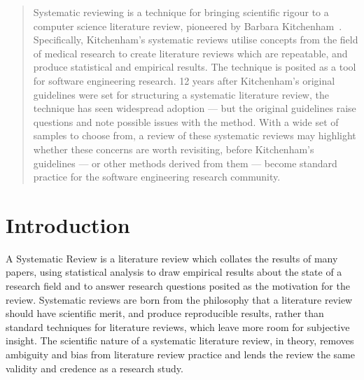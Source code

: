 

\maketitle

\begin{abstract}
Systematic reviewing is a technique for bringing scientific rigour to a computer science literature review, pioneered by Barbara Kitchenham~\citep{Kitchenham2004}. Specifically, Kitchenham's systematic reviews utilise concepts from the field of medical research to create literature reviews which are repeatable, and produce statistical and empirical results. The technique is posited as a tool for software engineering research. 12 years after Kitchenham's original guidelines were set for structuring a systematic literature review, the technique has seen widespread adoption --- but the original guidelines raise questions and note possible issues with the method. With a wide set of samples to choose from, a review of these systematic reviews may highlight whether these concerns are worth revisiting, before Kitchenham's guidelines --- or other methods derived from them --- become standard practice for the software engineering research community.
\end{abstract}

\section{Introduction}
A Systematic Review is a literature review which collates the results of many papers, using statistical analysis to draw empirical results about the state of a research field and to answer research questions posited as the motivation for the review. Systematic reviews are born from the philosophy that a literature review should have scientific merit, and produce reproducible results, rather than standard techniques for literature reviews, which leave more room for subjective insight. The scientific nature of a systematic literature review, in theory, removes ambiguity and bias from literature review practice and lends the review the same validity and credence as a research study.\par

